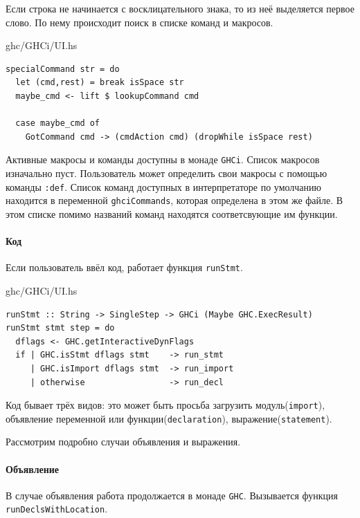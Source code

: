 \documentclass[fontsize=14pt, paper=a4, pagesize, DIV=calc]{scrartcl}
\def\code#1{\texttt{#1}}
\begin{document}
Если строка не начинается с восклицательного знака, то из неё выделяется первое
слово. По нему происходит поиск в списке команд и макросов. 

\begin{ListingEnv}
\caption{ghc/GHCi/UI.hs}
\begin{lstlisting}[firstnumber=1206]
specialCommand str = do
  let (cmd,rest) = break isSpace str
  maybe_cmd <- lift $ lookupCommand cmd

  case maybe_cmd of
    GotCommand cmd -> (cmdAction cmd) (dropWhile isSpace rest)
\end{lstlisting}
\end{ListingEnv}

Активные макросы и команды доступны в монаде \code{GHCi}. Список макросов
изначально пуст. Пользователь может определить свои макросы с помощью команды
\code{:def}. Список команд доступных в интерпретаторе по умолчанию находится в
переменной \code{ghciCommands}, которая определена в этом же файле. В этом
списке помимо названий команд находятся соответсвующие им функции.

\paragraph{Код}

Если пользователь ввёл код, работает функция \code{runStmt}.

\begin{ListingEnv}
\caption{ghc/GHCi/UI.hs}
\begin{lstlisting}[firstnumber=1080]
runStmt :: String -> SingleStep -> GHCi (Maybe GHC.ExecResult)
runStmt stmt step = do
  dflags <- GHC.getInteractiveDynFlags
  if | GHC.isStmt dflags stmt    -> run_stmt
     | GHC.isImport dflags stmt  -> run_import
     | otherwise                 -> run_decl
\end{lstlisting}
\end{ListingEnv}

Код бывает трёх видов: это может быть просьба загрузить модуль(\code{import}),
объявление переменной или функции(\code{declaration}),
выражение(\code{statement}).

Рассмотрим подробно случаи объявления и выражения.

\paragraph{Объявление}

В случае объявления работа продолжается в монаде \code{GHC}. Вызывается функция
\code{runDeclsWithLocation}.
\end{document}
